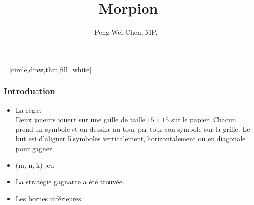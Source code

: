 \documentclass{beamer}
\title{Morpion}
\author{Peng-Wei Chen, MP, \oldstylenums{2017}-\oldstylenums{2018}}
\date{}
\begin{document}
=[circle,draw,thin,fill=white]

\begin{frame}
    \titlepage
\end{frame}

\begin{frame}
    \frametitle{Introduction}
    \begin{itemize}
        \item La règle:\\
Deux joueurs jouent sur une grille de taille $15 \times 15$ sur le papier. Chacun prend un symbole et on dessine au tour par tour son symbole sur la grille. Le but est d'aligner 5 symboles verticalement, horizontalement ou en diagonale pour gagner.
        \pause
        \item (m, n, k)-jeu
        \pause
        \item La stratégie gagnante a été trouvée.
        
        \pause
        \item Les bornes inférieures.
    \end{itemize}
    
\end{frame}
\end{document}
